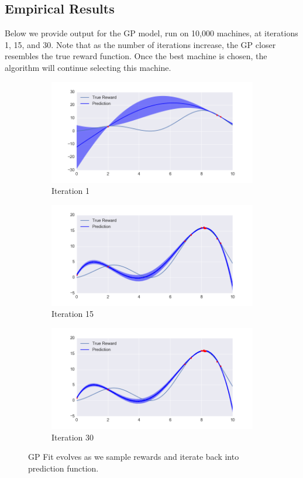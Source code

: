 \documentclass{article}
\begin{document}
\subsection{Empirical Results}

Below we provide output for the GP model, run on 10,000 machines, at iterations 1, 15, and 30. Note that as the number of iterations increase, the GP closer resembles the true reward function. Once the best machine is chosen, the algorithm will continue selecting this machine.\\

\begin{figure}
\centering
\begin{subfigure}{.5\textwidth}
  \centering
  \includegraphics[width=.8\linewidth]{gp_plot1.png}
  \caption{Iteration 1}
  \label{fig:sub1}
\end{subfigure}%
\begin{subfigure}{.5\textwidth}
  \centering
  \includegraphics[width=.8\linewidth]{gp_plot2.png}
  \caption{Iteration 15}
  \label{fig:sub2}
\end{subfigure}
\begin{subfigure}{.5\textwidth}
  \centering
  \includegraphics[width=.8\linewidth]{gp_plot3.png}
  \caption{Iteration 30}
  \label{fig:sub3}
\end{subfigure}
\caption{GP Fit evolves as we sample rewards and iterate back into prediction function. }
\label{fig:test}
\end{figure}
\end{document}
